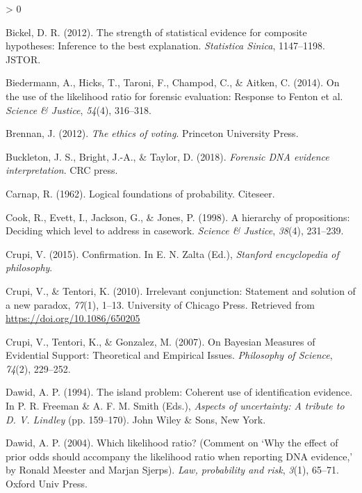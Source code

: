 \documentclass[
  10pt,
  dvipsnames,enabledeprecatedfontcommands]{scrartcl}
\newlength{\cslhangindent}
\newenvironment{CSLReferences}[2] %
 {%
  \setlength{\parindent}{0pt}
  \ifodd #1 \everypar{\setlength{\hangindent}{\cslhangindent}}\ignorespaces\fi
  \ifnum #2 > 0
  \setlength{\parskip}{#2\baselineskip}
  \fi
 }%
 {}
\begin{document}
\begin{CSLReferences}{1}{0}
\leavevmode\hypertarget{ref-bickel2012strength}{}%
Bickel, D. R. (2012). The strength of statistical evidence for composite
hypotheses: Inference to the best explanation. \emph{Statistica Sinica},
1147--1198. JSTOR.

\leavevmode\hypertarget{ref-biedermann2014UseLikelihoodRatio}{}%
Biedermann, A., Hicks, T., Taroni, F., Champod, C., \& Aitken, C.
(2014). On the use of the likelihood ratio for forensic evaluation:
{Response} to {Fenton} et al. \emph{Science \& Justice}, \emph{54}(4),
316--318.

\leavevmode\hypertarget{ref-brennan2012ethics}{}%
Brennan, J. (2012). \emph{The ethics of voting}. Princeton University
Press.

\leavevmode\hypertarget{ref-buckleton2018forensic}{}%
Buckleton, J. S., Bright, J.-A., \& Taylor, D. (2018). \emph{Forensic
DNA evidence interpretation}. CRC press.

\leavevmode\hypertarget{ref-carnap1962logical}{}%
Carnap, R. (1962). Logical foundations of probability. Citeseer.

\leavevmode\hypertarget{ref-Cook1998hierarchy}{}%
Cook, R., Evett, I., Jackson, G., \& Jones, P. (1998). A hierarchy of
propositions: Deciding which level to address in casework. \emph{Science
\& Justice}, \emph{38}(4), 231--239.

\leavevmode\hypertarget{ref-crupi2015confirmation}{}%
Crupi, V. (2015). Confirmation. In E. N. Zalta (Ed.), \emph{Stanford
encyclopedia of philosophy}.

\leavevmode\hypertarget{ref-CrupiTentori2010irrelevant}{}%
Crupi, V., \& Tentori, K. (2010). Irrelevant conjunction: Statement and
solution of a new paradox, \emph{77}(1), 1--13. University of Chicago
Press. Retrieved from \url{https://doi.org/10.1086/650205}

\leavevmode\hypertarget{ref-crupi2007BayesianMeasuresEvidential}{}%
Crupi, V., Tentori, K., \& Gonzalez, M. (2007). On {Bayesian Measures}
of {Evidential Support}: {Theoretical} and {Empirical Issues}.
\emph{Philosophy of Science}, \emph{74}(2), 229--252.

\leavevmode\hypertarget{ref-dawid1994island}{}%
Dawid, A. P. (1994). The island problem: Coherent use of identification
evidence. In P. R. Freeman \& A. F. M. Smith (Eds.), \emph{Aspects of
uncertainty: A tribute to {D. V. Lindley}} (pp. 159--170). John Wiley \&
Sons, New York.

\leavevmode\hypertarget{ref-dawid2004likelihood}{}%
Dawid, A. P. (2004). Which likelihood ratio? (Comment on {`{W}hy the
effect of prior odds should accompany the likelihood ratio when
reporting {DNA} evidence,'} by {R}onald {M}eester and {M}arjan
{S}jerps). \emph{Law, probability and risk}, \emph{3}(1), 65--71. Oxford
Univ Press.


\end{CSLReferences}
\end{document}
